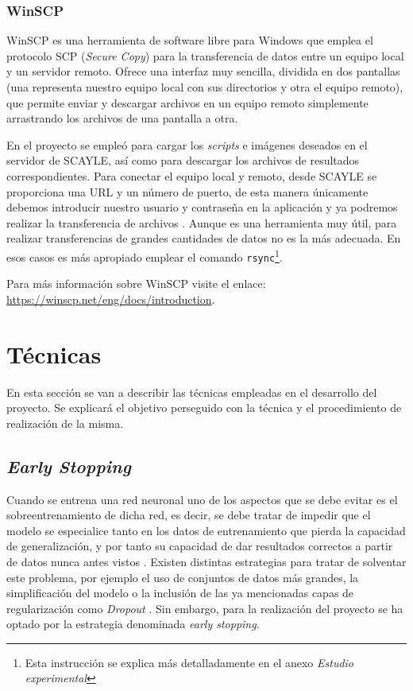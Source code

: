 \subsubsection{WinSCP}

WinSCP es una herramienta de software libre para Windows que emplea el protocolo SCP (\textit{Secure Copy}) para la transferencia de datos entre un equipo local y un servidor remoto. Ofrece una interfaz muy sencilla, dividida en dos pantallas (una representa nuestro equipo local con sus directorios y otra el equipo remoto), que permite enviar y descargar archivos en un equipo remoto simplemente arrastrando los archivos de una pantalla a otra. 

En el proyecto se empleó para cargar los \textit{scripts} e imágenes deseados en el servidor de SCAYLE, así como para descargar los archivos de resultados correspondientes. Para conectar el equipo local y remoto, desde SCAYLE se proporciona una URL y un número de puerto, de esta manera únicamente debemos introducir nuestro usuario y contraseña en la aplicación y ya podremos realizar la transferencia de archivos \cite{met:winscp}. Aunque es una herramienta muy útil, para realizar transferencias de grandes cantidades de datos no es la más adecuada. En esos casos es más apropiado emplear el comando \texttt{rsync}\footnote{Esta instrucción se explica más detalladamente en el anexo \textit{Estudio experimental}}.

Para más información sobre WinSCP visite el enlace: \url{https://winscp.net/eng/docs/introduction}.

\section{Técnicas}

En esta sección se van a describir las técnicas empleadas en el desarrollo del proyecto. Se explicará el objetivo perseguido con la técnica y el procedimiento de realización de la misma.

\subsection{\textit{Early Stopping}}

Cuando se entrena una red neuronal uno de los aspectos que se debe evitar es el sobreentrenamiento de dicha red, es decir, se debe tratar de impedir que el modelo se especialice tanto en los datos de entrenamiento que pierda la capacidad de generalización, y por tanto su capacidad de dar resultados correctos a partir de datos nunca antes vistos \cite{early:butwhen}. Existen distintas estrategias para tratar de solventar este problema, por ejemplo el uso de conjuntos de datos más grandes, la simplificación del modelo o la inclusión de las ya mencionadas capas de regularización como \textit{Dropout} \cite{early:overview}. Sin embargo, para la realización del proyecto se ha optado por la estrategia denominada \textit{early stopping}.

